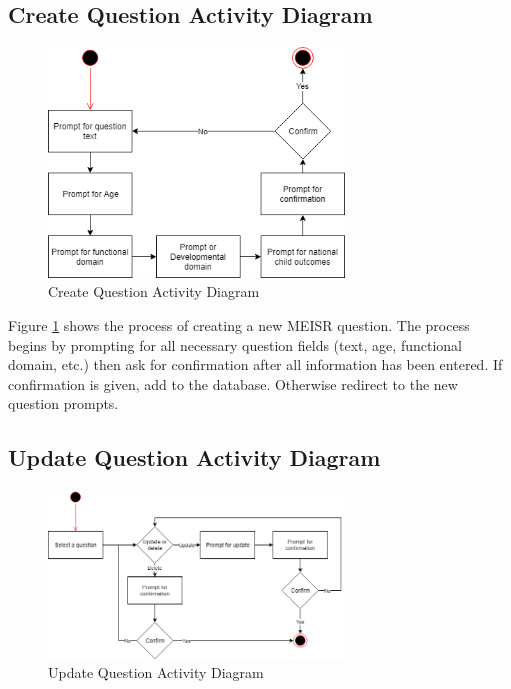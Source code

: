 \subsection{Create Question Activity Diagram}

\begin{figure}[h]
  \centering
  \includegraphics[width=0.7\textwidth]{images/Create_Question_Activity_Diagram.png}
  \caption{Create Question Activity Diagram}
  \label{fig:createQuestion}
\end{figure}

Figure \ref{fig:createQuestion} shows the process of creating a new MEISR question. The process begins by prompting for all necessary question fields (text, age, functional domain, etc.) then ask for confirmation after all information has been entered. If confirmation is given, add to the database. Otherwise redirect to the new question prompts.

\subsection{Update Question Activity Diagram}

\begin{figure}[h]
  \centering
  \includegraphics[width=0.7\textwidth]{images/Update_Question_Activity_Diagram.png}
  \caption{Update Question Activity Diagram}
  \label{fig:updateQuestion}
\end{figure}

